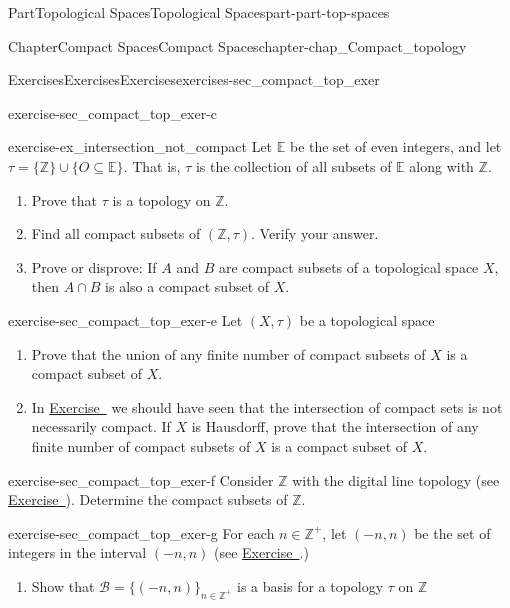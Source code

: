 \documentclass[oneside,10pt,]{book}
\newcommand{\xreffont}{\relax}
\numberwithin{equation}{chapter}
\newcommand{\Z}{\mathbb{Z}}
\newcommand{\E}{\mathbb{E}}
\newcommand{\B}{\mathcal{B}}
\begin{document}
\begin{partptx}{Part}{Topological Spaces}{}{Topological Spaces}{}{}{part-part-top-spaces}
\begin{chapterptx}{Chapter}{Compact Spaces}{}{Compact Spaces}{}{}{chapter-chap_Compact_topology}
\begin{exercises-section}{Exercises}{Exercises}{}{Exercises}{}{}{exercises-sec_compact_top_exer}
\begin{divisionexercise}{2}{}{}{exercise-sec_compact_top_exer-c}
\end{divisionexercise}%
\begin{divisionexercise}{3}{}{}{exercise-ex_intersection_not_compact}%
Let \(\E\) be the set of even integers, and let \(\tau = \{\Z\} \cup \{O \subseteq \E\}\). That is, \(\tau\) is the collection of all subsets of \(\E\) along with \(\Z\).%
\begin{enumerate}[font=\bfseries,label=(\alph*),ref=\alph*]%
\item{}Prove that \(\tau\) is a topology on \(\Z\).%
\item{}Find all compact subsets of \((\Z, \tau)\). Verify your answer.%
\item{}Prove or disprove: If \(A\) and \(B\) are compact subsets of a topological space \(X\), then \(A \cap B\) is also a compact subset of \(X\).%
\end{enumerate}%
\end{divisionexercise}%
\begin{divisionexercise}{4}{}{}{exercise-sec_compact_top_exer-e}%
Let \((X,\tau)\) be a topological space%
\begin{enumerate}[font=\bfseries,label=(\alph*),ref=\alph*]%
\item{}Prove that the union of any finite number of compact subsets of \(X\) is a compact subset of \(X\).%
\item{}In \hyperlink{exercise-ex_intersection_not_compact}{Exercise~{\xreffont 3}} we should have seen that the intersection of compact sets is not necessarily compact. If \(X\) is Hausdorff, prove that the intersection of any finite number of compact subsets of \(X\) is a compact subset of \(X\).%
\end{enumerate}%
\end{divisionexercise}%
\begin{divisionexercise}{5}{}{}{exercise-sec_compact_top_exer-f}%
Consider \(\Z\) with the digital line topology (see \hyperlink{exercise-ex_digital_line_topology}{Exercise~{\xreffont 11}}). Determine the compact subsets of \(\Z\).%
\end{divisionexercise}%
\begin{divisionexercise}{6}{}{}{exercise-sec_compact_top_exer-g}%
For each \(n \in \Z^+\), let \((-n,n)\) be the set of integers in the interval \((-n,n)\) (see \hyperlink{exercise-ex_coarse_topology_example}{Exercise~{\xreffont 4}}.)%
\begin{enumerate}[font=\bfseries,label=(\alph*),ref=\alph*]%
\item{}Show that \(\B = \{(-n,n)\}_{n \in \Z^+}\) is a basis for a topology \(\tau\) on \(\Z\)%

\end{enumerate}
\end{divisionexercise}
\end{exercises-section}
\end{chapterptx}
\end{partptx}
\end{document}
